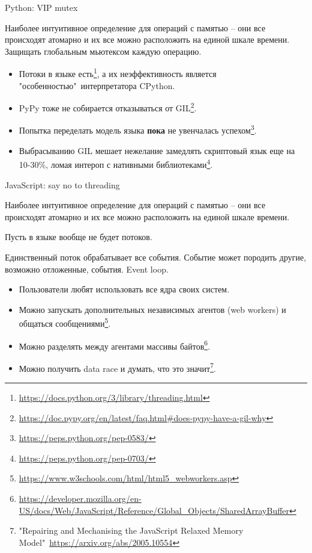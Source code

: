 \begin{frame}{Python: VIP mutex}

Наиболее интуитивное определение для операций с памятью -- они все происходят атомарно и их все можно расположить на единой шкале времени.
Защищать глобальным мьютексом каждую операцию.
 
\pause
\begin{itemize}
	\item Потоки в языке есть\footnote<2->{\tiny\url{https://docs.python.org/3/library/threading.html}}, а их неэффективность является "особенностью"\ интерпретатора CPython.

	\pause
	\item PyPy тоже не собирается отказываться от GIL\footnote<3->{\tiny\url{https://doc.pypy.org/en/latest/faq.html#does-pypy-have-a-gil-why}}.

	\pause
	\item Попытка переделать модель языка \textbf{пока} не увенчалась успехом\footnote<4->{\tiny\url{https://peps.python.org/pep-0583/}}.

	\pause
	\item Выбрасыванию GIL мешает нежелание замедлять скриптовый язык еще на 10-30\%, ломая интероп с нативными библиотеками\footnote<5->{\tiny\url{https://peps.python.org/pep-0703/}}.
\end{itemize}
\end{frame}

\begin{frame}[fragile, t]{JavaScript: say no to threading}

Наиболее интуитивное определение для операций с памятью -- они все происходят атомарно и их все можно расположить на единой шкале времени.

\pause
Пусть в языке вообще не будет потоков.

\pause
Единственный поток обрабатывает все события. Событие может породить другие, возможно отложенные, события.
\pause
Event loop.

\pause

\begin{itemize}
	\item Пользователи любят использовать все ядра своих систем.
	\pause
	\item Можно запускать дополнительных независимых агентов (web workers) и общаться сообщениями\footnote<6->{\tiny\url{https://www.w3schools.com/html/html5_webworkers.asp}}.
	\pause
	\item Можно разделять между агентами массивы байтов\footnote<7->{\tiny\url{https://developer.mozilla.org/en-US/docs/Web/JavaScript/Reference/Global_Objects/SharedArrayBuffer}}.
	\pause
	\item Можно получить data race и думать, что это значит\footnote<8->{\tiny "Repairing and Mechanising the JavaScript Relaxed Memory Model"\ \url{https://arxiv.org/abs/2005.10554}}.
\end{itemize}

\end{frame}

